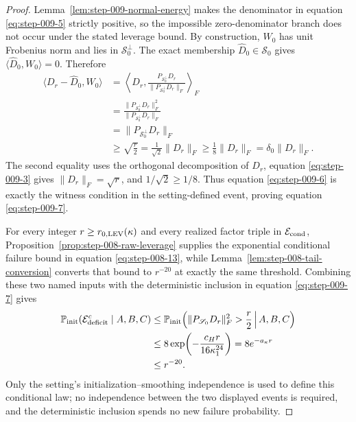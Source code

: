 \begin{proof}
Lemma~\ref{lem:step-009-normal-energy} makes the
denominator in equation \eqref{eq:step-009-5} strictly positive, so the impossible
zero-denominator branch does not occur under the stated leverage bound. By construction,
\(W_0\) has unit Frobenius norm and lies in \(\mathscr S_0^\perp\).
The exact membership \(\widehat D_0\in\mathscr S_0\) gives
\(\langle\widehat D_0,W_0\rangle=0\). Therefore
\begin{equation}
\begin{aligned}
  \langle D_r-\widehat D_0,W_0\rangle
  &=\left\langle D_r,
    \frac{P_{\mathscr S_0^\perp}D_r}
    {\|P_{\mathscr S_0^\perp}D_r\|_F}\right\rangle_F\\
  &=\frac{\|P_{\mathscr S_0^\perp}D_r\|_F^2}
    {\|P_{\mathscr S_0^\perp}D_r\|_F}\\
  &=\|P_{\mathscr S_0^\perp}D_r\|_F\\
  &\ge\sqrt{\frac r2}
   =\frac1{\sqrt2}\|D_r\|_F
   \ge\frac18\|D_r\|_F
   =\delta_0\|D_r\|_F.
\end{aligned}\label{eq:step-009-8}
\end{equation}
The second equality uses the orthogonal decomposition of \(D_r\), equation
\eqref{eq:step-009-3} gives \(\|D_r\|_F=\sqrt r\), and
\(1/\sqrt2\ge1/8\). Thus equation \eqref{eq:step-009-6} is exactly the witness condition in
the setting-defined event, proving equation \eqref{eq:step-009-7}. 

For every integer \(r\ge r_{0,\rm LEV}(\kappa)\) and every realized factor
triple in \(\mathcal E_{\rm cond}\),
Proposition~\ref{prop:step-008-raw-leverage} supplies the exponential
conditional failure bound in equation \eqref{eq:step-008-13}, while
Lemma~\ref{lem:step-008-tail-conversion} converts that bound to
\(r^{-20}\) at exactly the same threshold. Combining these two named inputs
with the deterministic inclusion in equation \eqref{eq:step-009-7} gives
\begin{equation}
\begin{aligned}
  \mathbb P_{\rm init}(\mathcal E_{\rm deficit}^{c}\mid A,B,C)
  &\le
  \mathbb P_{\rm init}\!\left(
    \|P_{\mathscr S_0}D_r\|_F^2>\frac r2\,\middle|\,A,B,C
  \right)\\
  &\le 8\exp\!\left(-\frac{c_Hr}{16\kappa_1^{24}}\right)
   =8e^{-a_\kappa r}\\
  &\le r^{-20}.
\end{aligned}\label{eq:step-009-9}
\end{equation}
Only the setting's initialization--smoothing independence is used to define
this conditional law; no independence between the two displayed events is
required, and the deterministic inclusion spends no new failure probability.

\end{proof}

